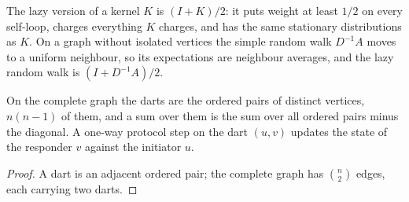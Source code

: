 \begin{definition}\label{def:randomwalk}
\leanok
{}
The lazy version of a kernel $K$ is $(I+K)/2$: it puts weight at least $1/2$ on every
self-loop, charges everything $K$ charges, and has the same stationary distributions as $K$.
On a graph without isolated vertices the simple random walk $D^{-1}A$ moves to a uniform
neighbour, so its expectations are neighbour averages, and the lazy random walk is
$(I+D^{-1}A)/2$.
\end{definition}
\begin{lemma}\label{lem:edgeround-top}
\leanok
{}
On the complete graph
the darts are the ordered pairs of distinct vertices, $n(n-1)$ of them, and a sum over them is
the sum over all ordered pairs minus the diagonal. A one-way protocol step on the dart $(u,v)$
updates the state of the responder $v$ against the initiator $u$.
\end{lemma}
\begin{proof}\leanok
A dart is an adjacent ordered pair; the complete graph has $\binom n2$ edges, each carrying two
darts.
\end{proof}
